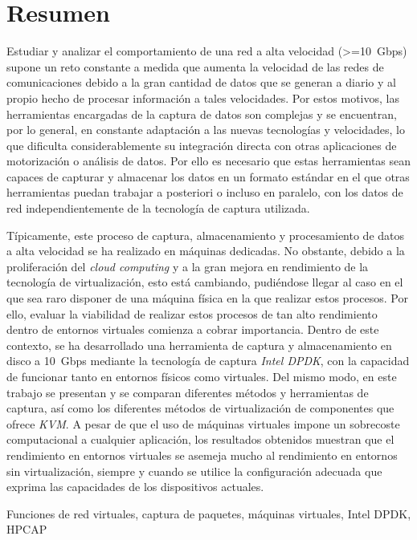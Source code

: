 \chapter*{Resumen}

\begin{abstractEs}
Estudiar y analizar el comportamiento de una red a alta velocidad (>=10~Gbps) supone un reto constante a medida que aumenta la velocidad de las redes de comunicaciones debido a la gran cantidad de datos que se generan a diario y al propio hecho de procesar información a tales velocidades.
Por estos motivos, las herramientas encargadas de la captura de datos son complejas y se encuentran, por lo general, en constante adaptación a las nuevas tecnologías y  velocidades, lo que dificulta considerablemente su integración directa con otras aplicaciones de motorización o análisis de datos.
Por ello es necesario que estas herramientas sean capaces de capturar y almacenar los datos en un formato estándar en el que otras herramientas puedan trabajar a posteriori o incluso en paralelo, con los datos de red independientemente de la tecnología de captura utilizada.

Típicamente, este proceso de captura, almacenamiento y procesamiento de datos a alta velocidad se ha realizado en máquinas dedicadas. No obstante, debido a la proliferación del \textit{cloud computing} y a la gran mejora en rendimiento de la tecnología de virtualización, esto está cambiando, pudiéndose llegar al caso en el que sea raro disponer de una máquina física en la que realizar estos procesos. Por ello, evaluar la viabilidad de realizar estos procesos de tan alto rendimiento dentro de entornos virtuales comienza a cobrar importancia.
Dentro de este contexto, se ha desarrollado una herramienta de captura y almacenamiento en disco a 10~Gbps mediante la tecnología de captura \textit{Intel DPDK}, con la capacidad de funcionar tanto en entornos físicos como virtuales. Del mismo modo, en este trabajo se presentan y se comparan diferentes métodos y herramientas de captura, así como los diferentes métodos de virtualización de componentes que ofrece \textit{KVM}.
A pesar de que el uso de máquinas virtuales impone un sobrecoste computacional a cualquier aplicación, los resultados obtenidos muestran que el rendimiento en entornos virtuales se asemeja mucho al rendimiento en entornos sin virtualización, siempre y cuando se utilice la configuración adecuada que exprima las capacidades de los dispositivos actuales.
\end{abstractEs}

\begin{keywordsEs}
Funciones de red virtuales, captura de paquetes, máquinas virtuales, Intel DPDK, HPCAP
\end{keywordsEs}
